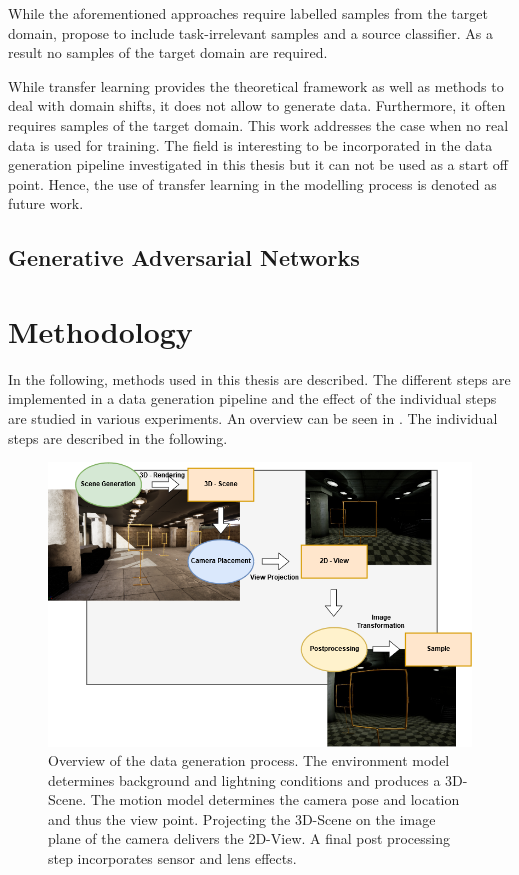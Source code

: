 While the aforementioned approaches require labelled samples from the target domain, \citeauthor{Peng2017} \cite{Peng2017} propose to include task-irrelevant samples and a source classifier. As a result no samples of the target domain are required.

While transfer learning provides the theoretical framework as well as methods to deal with domain shifts, it does not allow to generate data. Furthermore, it often requires samples of the target domain. This work addresses the case when no real data is used for training. The field is interesting to be incorporated in the data generation pipeline investigated in this thesis but it can not be used as a start off point. Hence, the use of transfer learning in the modelling process is denoted as future work.

\subsection{Generative Adversarial Networks}

\cite{Inoue} 

\section{Methodology}
\label{sec:training:meth}

In the following, methods used in this thesis are described. The different steps are implemented in a data generation pipeline and the effect of the individual steps are studied in various experiments. An overview can be seen in  . The individual steps are described in the following.

\begin{figure}[htbp]
	\centering
	\includegraphics[width=\textwidth]{fig/Toolchain_datagen}
	\caption{Overview of the data generation process. The environment model determines background and lightning conditions and produces a 3D-Scene. The motion model determines the camera pose and location and thus the view point. Projecting the 3D-Scene on the image plane of the camera delivers the 2D-View. A final post processing step incorporates sensor and lens effects.}
	\label{fig:training:toolchain_datagen}
\end{figure}


